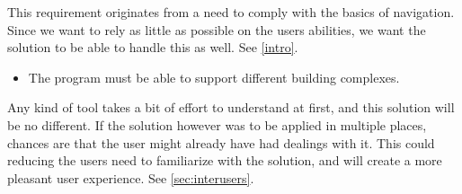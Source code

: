This requirement originates from a need to comply with the basics of navigation. Since we want to rely as little as possible on the users abilities, we want the solution to be able to handle this as well. See \cref{intro}.

\begin{itemize}
	\item The program must be able to support different building complexes.
\end{itemize}

Any kind of tool takes a bit of effort to understand at first, and this solution will be no different. If the solution however was to be applied in multiple places, chances are that the user might already have had dealings with it. This could reducing the users need to familiarize with the solution, and will create a more pleasant user experience. See \cref{sec:interusers}.

